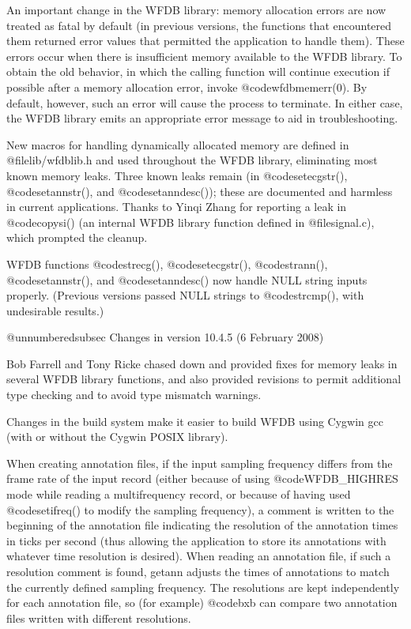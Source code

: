 {{{{{{{{An important change in the WFDB library: memory allocation errors are
now treated as fatal by default (in previous versions, the functions
that encountered them returned error values that permitted the
application to handle them).  These errors occur when there is
insufficient memory available to the WFDB library. To obtain the old
behavior, in which the calling function will continue execution if
possible after a memory allocation error, invoke @code{wfdbmemerr(0)}.
By default, however, such an error will cause the process to
terminate.  In either case, the WFDB library emits an appropriate
error message to aid in troubleshooting.

New macros for handling dynamically allocated memory are defined in
@file{lib/wfdblib.h} and used throughout the WFDB library, eliminating most
known memory leaks.  Three known leaks remain (in @code{setecgstr()}, 
@code{setannstr()}, and @code{setanndesc()});  these are documented and
harmless in current applications.  Thanks to Yinqi Zhang for reporting a leak
in @code{copysi()} (an internal WFDB library function defined in
@file{signal.c}), which prompted the cleanup.
	
WFDB functions @code{strecg()}, @code{setecgstr()}, @code{strann()},
@code{setannstr()}, and @code{setanndesc()} now handle NULL string inputs
properly. (Previous versions passed NULL strings to @code{strcmp()}, with
undesirable results.)

@unnumberedsubsec Changes in version 10.4.5 (6 February 2008)

Bob Farrell and Tony Ricke chased down and provided fixes for memory leaks
in several WFDB library functions, and also provided revisions to permit
additional type checking and to avoid type mismatch warnings.

Changes in the build system make it easier to build WFDB using Cygwin
gcc (with or without the Cygwin POSIX library).

When creating annotation files, if the input sampling frequency differs
from the frame rate of the input record (either because of using
@code{WFDB_HIGHRES} mode while reading a multifrequency record, or because
of having used @code{setifreq()} to modify the sampling frequency), a comment
is written to the beginning of the annotation file indicating the
resolution of the annotation times in ticks per second (thus allowing
the application to store its annotations with whatever time resolution
is desired).  When reading an annotation file, if such a resolution
comment is found, getann adjusts the times of annotations to match the
currently defined sampling frequency.  The resolutions are kept
independently for each annotation file, so (for example) @code{bxb} can
compare two annotation files written with different resolutions.

}}}}}}}}
